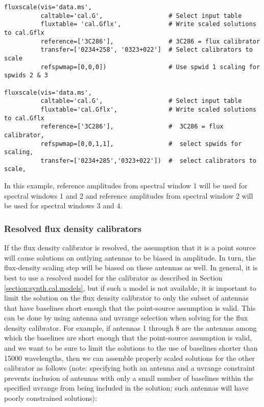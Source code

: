 \small
\begin{verbatim}
fluxscale(vis='data.ms',
          caltable='cal.G',                  # Select input table
          fluxtable= 'cal.Gflx',             # Write scaled solutions to cal.Gflx
          reference=['3C286'],               # 3C286 = flux calibrator
          transfer=['0234+258', '0323+022']  # Select calibrators to scale
          refspwmap=[0,0,0])                 # Use spwid 1 scaling for spwids 2 & 3

fluxscale(vis='data.ms',
          caltable='cal.G',                  # Select input table
          fluxtable='cal.Gflx',              # Write scaled solutions to cal.Gflx
          reference=['3C286'],               #  3C286 = flux calibrator,
          refspwmap=[0,0,1,1],               #  select spwids for scaling,
          transfer=['0234+285','0323+022'])  #  select calibrators to scale,
\end{verbatim}
\normalsize

In this example, reference amplitudes from spectral window 1 will be
used for spectral windows 1 and 2 and reference amplitudes from
spectral window 2 will be used for spectral windows 3 and 4.

\subsubsection{Resolved flux density calibrators}
\label{subsubsection:synth.resolved.cals}

If the flux density calibrator is resolved, the assumption that it is
a point source will cause solutions on outlying antennas to be biased
in amplitude.  In turn, the flux-density scaling step will be biased
on these antennas as well.  In general, it is best to use a resolved
model for the calibrator as described in Section
\ref{section:synth.cal.models}, but if such a model is not available,
it is important to limit the solution on the flux density calibrator
to only the subset of antennas that have baselines short enough that
the point-source assumption is valid.  This can be done by using
antenna and uvrange selection when solving for the flux density
calibrator.  For example, if antennas 1 through 8 are the antennas
among which the baselines are short enough that the point-source
assumption is valid, and we want to be sure to limit the solutions to
the use of baselines shorter than 15000 wavelengths, then we can
assemble properly scaled solutions for the other calibrator as follows
(note: specifying both an antenna and a uvrange constraint prevents
inclusion of antennas with only a small number of baselines within the
specified uvrange from being included in the solution; such antennas
will have poorly constrained solutions):

